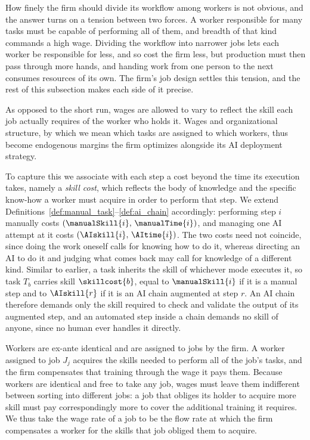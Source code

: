 How finely the firm should divide its workflow among workers is not obvious, and the answer turns on a tension between two forces.
A worker responsible for many tasks must be capable of performing all of them, and breadth of that kind commands a high wage.
Dividing the workflow into narrower jobs lets each worker be responsible for less, and so cost the firm less, but production must then pass through more hands, and handing work from one person to the next consumes resources of its own.
The firm's job design settles this tension, and the rest of this subsection makes each side of it precise.

As opposed to the short run, wages are allowed to vary to reflect the skill each job actually requires of the worker who holds it.
Wages and organizational structure, by which we mean which tasks are assigned to which workers, thus become endogenous margins the firm optimizes alongside its AI deployment strategy.

To capture this we associate with each step a cost beyond the time its execution takes, namely a \emph{skill cost}, which reflects the body of knowledge and the specific know-how a worker must acquire in order to perform that step.
We extend Definitions~\ref{def:manual_task}--\ref{def:ai_chain} accordingly: performing step $i$ manually costs $(\manualSkill{i},\, \manualTime{i})$, and managing one AI attempt at it costs $(\AIskill{i},\, \AItime{i})$.
The two costs need not coincide, since doing the work oneself calls for knowing how to do it, whereas directing an AI to do it and judging what comes back may call for knowledge of a different kind.
Similar to earlier, a task inherits the skill of whichever mode executes it, so task $T_b$ carries skill $\skillcost{b}$, equal to $\manualSkill{i}$ if it is a manual step and to $\AIskill{r}$ if it is an AI chain augmented at step $r$.
An AI chain therefore demands only the skill required to check and validate the output of its augmented step, and an automated step inside a chain demands no skill of anyone, since no human ever handles it directly.

Workers are ex-ante identical and are assigned to jobs by the firm.
A worker assigned to job $J_j$ acquires the skills needed to perform all of the job's tasks, and the firm compensates that training through the wage it pays them.
Because workers are identical and free to take any job, wages must leave them indifferent between sorting into different jobs: a job that obliges its holder to acquire more skill must pay correspondingly more to cover the additional training it requires.
We thus take the wage rate of a job to be the flow rate at which the firm compensates a worker for the skills that job obliged them to acquire.

